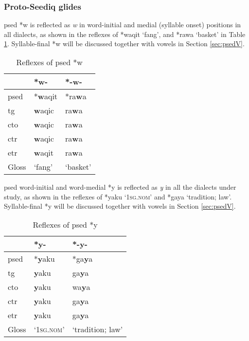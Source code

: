 \subsubsection{Proto-Seediq glides}

\acl{psed} *w is reflected as \textit{w} in word-initial and medial (syllable onset) positions in all dialects, as shown in the reflexes of *waqit `fang', and *rawa `basket' in Table \ref{tab:psed_w}. Syllable-final *w will be discussed together with vowels in Section \ref{sec:psedV}.

\begin{table}[!htbp]
\centering
\caption{Reflexes of \acl{psed} *w}
\label{tab:psed_w}
\begin{tabular}{lll}
\hline
           & *w-    & *-w-     \\ \hline
\acs{psed} & *\textbf{w}aqit & *ra\textbf{w}a    \\ \hdashline
\acs{tg}   & \textbf{w}aqic  & ra\textbf{w}a     \\
\acs{cto}  & \textbf{w}aqic  & ra\textbf{w}a     \\
\acs{ctr}  & \textbf{w}aqic  & ra\textbf{w}a     \\
\acs{etr}  & \textbf{w}aqit  & ra\textbf{w}a     \\ \hline
Gloss      & `fang' & `basket' \\ \hline
\end{tabular}
\end{table}

\acl{psed} word-initial and word-medial *y is reflected as \textit{y} in all the dialects under study, as shown in the reflexes of *yaku `\textsc{1sg.nom}' and *gaya `tradition; law'. Syllable-final *y will be discussed together with vowels in Section \ref{sec:psedV}.

\begin{table}[!htbp]
\centering
\caption{Reflexes of \acl{psed} *y}
\label{tab:psed_y}
\begin{tabular}{lll}
\hline
           & *y-                & *-y-             \\ \hline
\acs{psed} & *\textbf{y}aku              & *ga\textbf{y}a            \\ \hdashline
\acs{tg}   & \textbf{y}aku               & ga\textbf{y}a             \\
\acs{cto}  & \textbf{y}aku               & wa\textbf{y}a             \\
\acs{ctr}  & \textbf{y}aku               & ga\textbf{y}a             \\
\acs{etr}  & \textbf{y}aku               & ga\textbf{y}a             \\ \hline
Gloss      & `\textsc{1sg.nom}' & `tradition; law' \\ \hline
\end{tabular}
\end{table}

